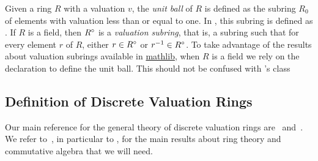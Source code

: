 \documentclass[sigplan,10pt,anonymous,review]{acmart}
\begin{document}
Given a ring $R$ with a valuation $v$, the \textit{unit ball}  of $R$ is defined as the subring $R_0$ of elements with valuation less than or equal to one. In \mathlib, this subring is defined as  \href{https://leanprover-community.github.io/mathlib_docs/ring_theory/valuation/integers.html#valuation.integer}{\extlink}. If $R$ is a field, then ${R}^\circ$ is a \emph{valuation subring}, that is, a subring such that for every element $r$ of $R$, either $r \in {R}^\circ$ or $r^{-1} \in {R}^\circ$.
To take advantage of the results about valuation subrings available in \href{https://leanprover-community.github.io/mathlib_docs/ring_theory/valuation/valuation_subring.html#valuation_subring}{mathlib}, when $R$ is a field we rely on the declaration \href{https://leanprover-community.github.io/mathlib_docs/ring_theory/valuation/valuation_subring.html#valuation.valuation_subring}{\extlink} to define the unit ball. This should not be confused with \mathlib's  \href{https://leanprover-community.github.io/mathlib_docs/ring_theory/valuation/valuation_ring.html#valuation_ring}{\extlink} class 
 
\subsection{Definition of Discrete Valuation Rings}\label{subsection:def_dvr}
Our main reference for the general theory of discrete valuation rings are~\cite{Ser62} and~\cite[Chapitre~VI]{Bou85}. We refer to~\cite{Bou07}, in particular to \cite[Chapitre~IV]{Bou07}, for the main results about ring theory and commutative algebra that we will need.
\end{document}
